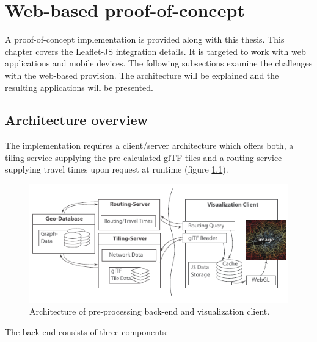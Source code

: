 
\cleardoublepage              %
\chapter{Web-based proof-of-concept}
  \label{chap:imple}
  A proof-of-concept implementation is provided along with this thesis. This
  chapter covers the Leaflet-JS integration details. It is targeted to work with
  web applications and mobile devices. The following subsections examine the
  challenges with the web-based provision. The architecture will be
  explained and the resulting applications will be presented.\par

  \section{Architecture overview}
    \label{sec:imple:archi}
    The implementation requires a client/server architecture which offers both,
    a tiling service supplying the pre-calculated glTF tiles and a routing
    service supplying travel times upon request at runtime (figure
    \ref{fig:imple:archi}).\par

    \begin{figure}[h]
      \centering
      \includegraphics[width=\linewidth]{./img/conceptual-overview-bw.pdf}
      \caption{Architecture of pre-processing back-end and visualization client.}
      \label{fig:imple:archi}
    \end{figure}

    The back-end consists of three components:\par

